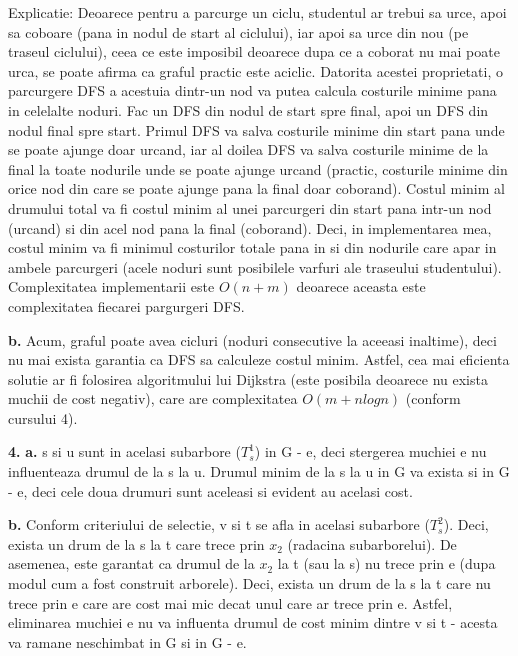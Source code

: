 \documentclass{article}
\begin{document}
Explicatie: Deoarece pentru a parcurge un ciclu, studentul ar trebui sa urce, apoi sa coboare (pana in nodul de start al ciclului), iar apoi sa urce din nou (pe traseul ciclului), ceea ce este imposibil deoarece dupa ce a coborat nu mai poate urca, se poate afirma ca graful practic este aciclic. Datorita acestei proprietati, o parcurgere DFS a acestuia dintr-un nod va putea calcula costurile minime pana in celelalte noduri. Fac un DFS din nodul de start spre final, apoi un DFS din nodul final spre start. Primul DFS va salva costurile minime din start pana unde se poate ajunge doar urcand, iar al doilea DFS va salva costurile minime de la final la toate nodurile unde se poate ajunge urcand (practic, costurile minime din orice nod din care se poate ajunge pana la final doar coborand). Costul minim al drumului total va fi costul minim al unei parcurgeri din start pana intr-un nod (urcand) si din acel nod pana la final (coborand). Deci, in implementarea mea, costul minim va fi minimul costurilor totale pana in si din nodurile care apar in ambele parcurgeri (acele noduri sunt posibilele varfuri ale traseului studentului). Complexitatea implementarii este $O(n+m)$ deoarece aceasta este complexitatea fiecarei pargurgeri DFS.

{\bf b.} Acum, graful poate avea cicluri (noduri consecutive la aceeasi inaltime), deci nu mai exista garantia ca DFS sa calculeze costul minim. Astfel, cea mai eficienta solutie ar fi folosirea algoritmului lui Dijkstra (este posibila deoarece nu exista muchii de cost negativ), care are complexitatea $O(m+nlogn)$ (conform cursului 4).

\vspace{0.5cm}

{\bf 4.} {\bf a.} s si u sunt in acelasi subarbore ($T_s^1$) in G - e, deci stergerea muchiei e nu influenteaza drumul de la s la u. Drumul minim de la s la u in G va exista si in G - e, deci cele doua drumuri sunt aceleasi si evident au acelasi cost.

{\bf b.} Conform criteriului de selectie, v si t se afla in acelasi subarbore ($T_s^2$). Deci, exista un drum de la s la t care trece prin $x_2$ (radacina subarborelui). De asemenea, este garantat ca drumul de la $x_2$ la t (sau la s) nu trece prin e (dupa modul cum a fost construit arborele). Deci, exista un drum de la s la t care nu trece prin e care are cost mai mic decat unul care ar trece prin e. Astfel, eliminarea muchiei e nu va influenta drumul de cost minim dintre v si t - acesta va ramane neschimbat in G si in G - e.
\end{document}
